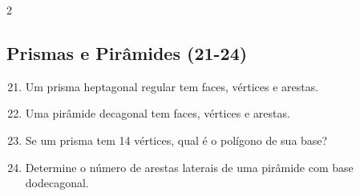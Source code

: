 \documentclass[11pt]{article}
\begin{document}
\begin{multicols}{2}
\subsection*{Prismas e Pirâmides (21-24)}
\begin{enumerate}\setcounter{enumi}{20}
    \item Um prisma heptagonal regular tem \underline{\hspace{1cm}} faces, \underline{\hspace{1cm}} vértices e \underline{\hspace{1cm}} arestas.
    
    \item Uma pirâmide decagonal tem \underline{\hspace{1cm}} faces, \underline{\hspace{1cm}} vértices e \underline{\hspace{1cm}} arestas.
    
    \item Se um prisma tem 14 vértices, qual é o polígono de sua base?
    
    \item Determine o número de arestas laterais de uma pirâmide com base dodecagonal.
      
    
\end{enumerate}

\end{multicols}
\end{document}
